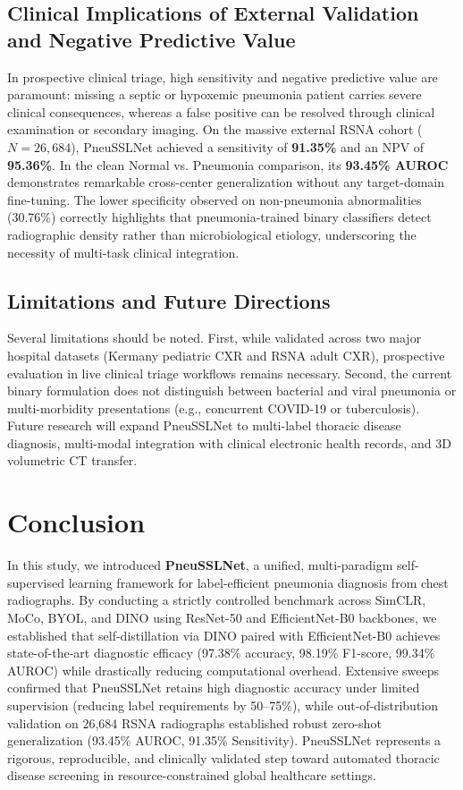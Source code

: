 \documentclass[journal,article,submit,moreauthors,pdftex]{Definitions/tsp}
\begin{document}
\subsection{Clinical Implications of External Validation and Negative Predictive Value}
In prospective clinical triage, high sensitivity and negative predictive value are paramount: missing a septic or hypoxemic pneumonia patient carries severe clinical consequences, whereas a false positive can be resolved through clinical examination or secondary imaging. On the massive external RSNA cohort ($N=26,684$), PneuSSLNet achieved a sensitivity of \textbf{91.35\%} and an NPV of \textbf{95.36\%}. In the clean Normal vs. Pneumonia comparison, its \textbf{93.45\% AUROC} demonstrates remarkable cross-center generalization without any target-domain fine-tuning. The lower specificity observed on non-pneumonia abnormalities (30.76\%) correctly highlights that pneumonia-trained binary classifiers detect radiographic density rather than microbiological etiology, underscoring the necessity of multi-task clinical integration.

\subsection{Limitations and Future Directions}
Several limitations should be noted. First, while validated across two major hospital datasets (Kermany pediatric CXR and RSNA adult CXR), prospective evaluation in live clinical triage workflows remains necessary. Second, the current binary formulation does not distinguish between bacterial and viral pneumonia or multi-morbidity presentations (e.g., concurrent COVID-19 or tuberculosis). Future research will expand PneuSSLNet to multi-label thoracic disease diagnosis, multi-modal integration with clinical electronic health records, and 3D volumetric CT transfer.

\section{Conclusion} \label{sect:s6}
In this study, we introduced \textbf{PneuSSLNet}, a unified, multi-paradigm self-supervised learning framework for label-efficient pneumonia diagnosis from chest radiographs. By conducting a strictly controlled benchmark across SimCLR, MoCo, BYOL, and DINO using ResNet-50 and EfficientNet-B0 backbones, we established that self-distillation via DINO paired with EfficientNet-B0 achieves state-of-the-art diagnostic efficacy (97.38\% accuracy, 98.19\% F1-score, 99.34\% AUROC) while drastically reducing computational overhead. Extensive sweeps confirmed that PneuSSLNet retains high diagnostic accuracy under limited supervision (reducing label requirements by 50--75\%), while out-of-distribution validation on 26,684 RSNA radiographs established robust zero-shot generalization (93.45\% AUROC, 91.35\% Sensitivity). PneuSSLNet represents a rigorous, reproducible, and clinically validated step toward automated thoracic disease screening in resource-constrained global healthcare settings.
\end{document}
